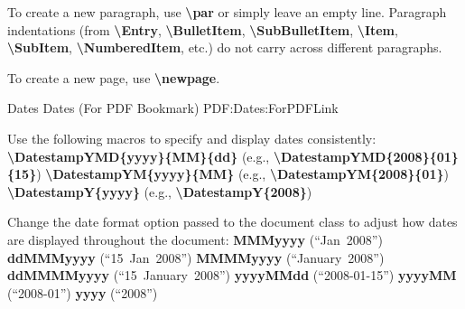\documentclass[letterpaper,MMMyyyy,nonstopmode]{simpleresumecv}
\newcommand{\Code}[1]{\mbox{\textbf{#1}}}
\newcommand{\CodeCommand}[1]{\mbox{\textbf{\textbackslash{#1}}}}
\begin{document}
\begin{Body}
\Gap
\BulletItem
To create a new paragraph, use \CodeCommand{par} or simply leave an empty line.
Paragraph indentations (from
\CodeCommand{Entry},
\CodeCommand{BulletItem},
\CodeCommand{SubBulletItem},
\CodeCommand{Item},
\CodeCommand{SubItem},
\CodeCommand{NumberedItem},
etc.) do not carry across different paragraphs.

\Gap
\BulletItem
To create a new page, use \CodeCommand{newpage}.

\BigGap
\SubSection
{Dates}
{Dates (For PDF Bookmark)}
{PDF:Dates:ForPDFLink}

\Gap
\BulletItem
Use the following macros to specify and display dates consistently:
\SubBulletItem
\CodeCommand{DatestampYMD\{yyyy\}\{MM\}\{dd\}}
(e.g., \CodeCommand{DatestampYMD\{2008\}\{01\}\{15\}})
\SubBulletItem
\CodeCommand{DatestampYM\{yyyy\}\{MM\}}
(e.g., \CodeCommand{DatestampYM\{2008\}\{01\}})
\SubBulletItem
\CodeCommand{DatestampY\{yyyy\}}
(e.g., \CodeCommand{DatestampY\{2008\}})

\Gap
\BulletItem
Change the date format option passed to the document class to adjust how dates are displayed throughout the document:
\SubBulletItem
\Code{MMMyyyy} (``Jan~2008'')
\SubBulletItem
\Code{ddMMMyyyy} (``15~Jan~2008'')
\SubBulletItem
\Code{MMMMyyyy} (``January~2008'')
\SubBulletItem
\Code{ddMMMMyyyy} (``15~January~2008'')
\SubBulletItem
\Code{yyyyMMdd} (``2008-01-15'')
\SubBulletItem
\Code{yyyyMM} (``2008-01'')
\SubBulletItem
\Code{yyyy} (``2008'')

\endgroup

\fi

\end{Body}
\end{document}
